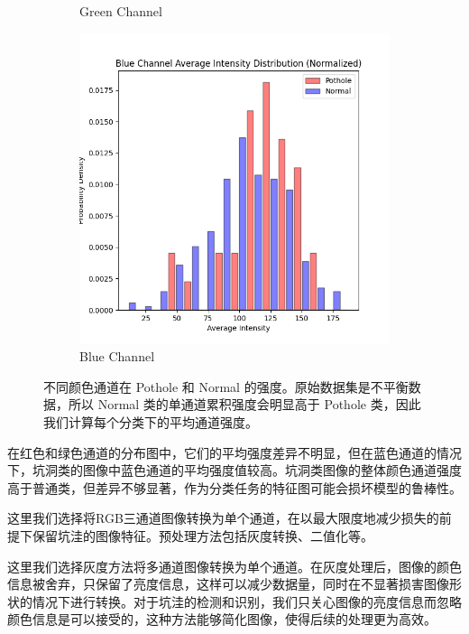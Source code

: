 \documentclass[a4paper, 10pt]{article}
\begin{document}
\begin{figure}[htbp]
\begin{subfigure}{0.3\textwidth}
			\caption{Green Channel}
			\label{fig: Green Channel Histogram}
		\end{subfigure}	
		\begin{subfigure}{0.3\textwidth}
			\includegraphics[width=\linewidth]{picture/Blue_distribution}
			\caption{Blue Channel}
			\label{fig: Blue Channel Histogram}
		\end{subfigure}	
		\caption{
			\label{fig: Color Channel}
			不同颜色通道在 Pothole 和 Normal 的强度。原始数据集是不平衡数据，所以 Normal 类的单通道累积强度会明显高于 Pothole 类，因此我们计算每个分类下的平均通道强度。
		}
	\end{figure}
	
	在红色和绿色通道的分布图中，它们的平均强度差异不明显，但在蓝色通道的情况下，坑洞类的图像中蓝色通道的平均强度值较高。坑洞类图像的整体颜色通道强度高于普通类，但差异不够显著，作为分类任务的特征图可能会损坏模型的鲁棒性。
	
	这里我们选择将RGB三通道图像转换为单个通道，在以最大限度地减少损失的前提下保留坑洼的图像特征。预处理方法包括灰度转换、二值化等。
	
	这里我们选择灰度方法将多通道图像转换为单个通道。在灰度处理后，图像的颜色信息被舍弃，只保留了亮度信息，这样可以减少数据量，同时在不显著损害图像形状的情况下进行转换。对于坑洼的检测和识别，我们只关心图像的亮度信息而忽略颜色信息是可以接受的，这种方法能够简化图像，使得后续的处理更为高效。
	
\end{document}
